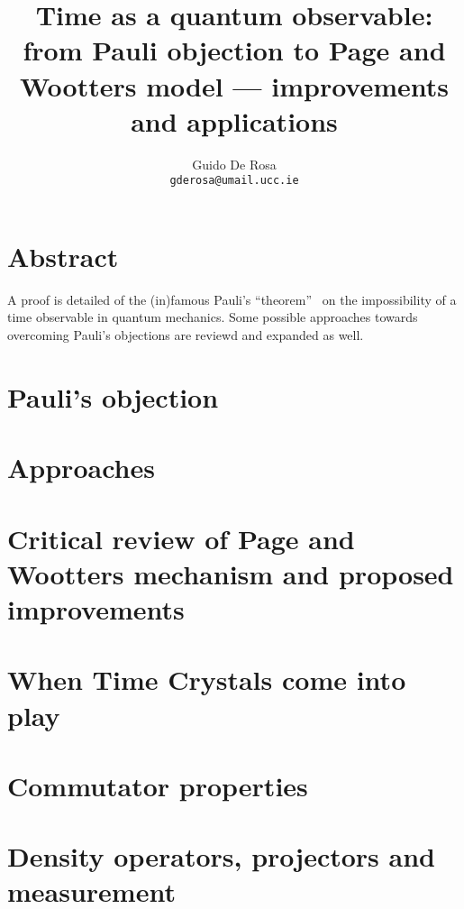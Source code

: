 \documentclass{book}
\author{Guido De Rosa \\ \small\tt{gderosa@umail.ucc.ie}}
\title{Time as a quantum observable: from Pauli objection to Page and Wootters model --- improvements and applications}
\begin{document}
\maketitle

\chapter*{Abstract}
A proof is detailed of the (in)famous Pauli's ``theorem''~\cite{PauliFootnote}
on the impossibility of a time observable in quantum mechanics. Some possible
approaches towards overcoming Pauli's objections are reviewd and expanded as well.

\chapter{Pauli's objection}



\chapter{Approaches}


\chapter{Critical review of Page and Wootters mechanism and proposed improvements}


\chapter{When Time Crystals come into play}


\appendix
\chapter{Commutator properties}

\chapter{Density operators, projectors and measurement}




\end{document}
